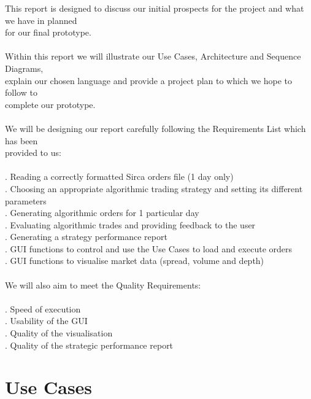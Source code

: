 \documentclass[a4paper]{article}
\begin{document}
This report is designed to discuss our initial prospects for the project and what we have in planned \\
for our final prototype. \\
\\ 
Within this report we will illustrate our Use Cases, Architecture and Sequence Diagrams,  \\
explain our chosen language and provide a project plan to which we hope to follow to   \\
complete our prototype.  \\
\\
We will be designing our report carefully following the Requirements List which has been \\
provided to us:  \\
\\
\indent{}. Reading a correctly formatted Sirca orders file (1 day only) \\
\indent{}. Choosing an appropriate algorithmic trading strategy and setting its different \\
\indent\indent\indent	 		parameters \\
\indent{}. Generating algorithmic orders for 1 particular day \\
\indent{}. Evaluating algorithmic trades and providing feedback to the user \\
\indent{}. Generating a strategy performance report \\ 
\indent{}. GUI functions to control and use the Use Cases to load and execute orders \\ 
\indent{}. GUI functions to visualise market data (spread, volume and depth) \\
\\
We will also aim to meet the Quality Requirements: \\
\\
\indent{}. Speed of execution \\
\indent{}. Usability of the GUI \\
\indent{}. Quality of the visualisation \\
\indent{}. Quality of the strategic performance report \\	


\newpage	

\section {Use Cases}
\end{document}

